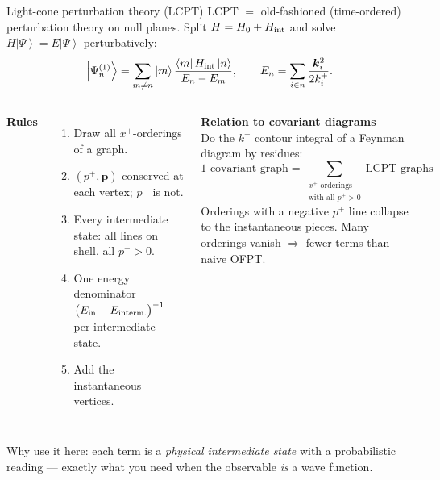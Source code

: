 \documentclass[9pt,aspectratio=169]{beamer}
\newcommand{\hl}[1]{\textcolor{acc}{#1}}
\newcommand{\hb}[1]{\textcolor{blu}{#1}}
\newcommand{\pp}{p^{+}}
\newcommand{\xp}{x^{+}}
\newcommand{\ket}[1]{\left|#1\right\rangle}
\newcommand{\bra}[1]{\left\langle#1\right|}
\begin{document}
\begin{frame}{Light-cone perturbation theory (LCPT)}
LCPT $=$ \hl{old-fashioned (time-ordered) perturbation theory} on null planes.
Split $H=H_{0}+H_{\rm int}$ and solve $H\ket{\Psi}=E\ket{\Psi}$ perturbatively:
\[
\ket{\Psi^{(1)}_{n}}=\sum_{m\neq n}\ket{m}\frac{\bra{m}H_{\rm int}\ket{n}}{E_{n}-E_{m}},
\qquad E_{n}=\sum_{i\in n}\frac{\bm k_{i}^{2}}{2k^{+}_{i}} .
\]
\begin{columns}[T,onlytextwidth]
\textbf{Rules}
\begin{enumerate}\small
  \item Draw all \hl{$\xp$-orderings} of a graph.
  \item $(\pp,\bm p)$ conserved at each vertex; \hb{$p^{-}$ is not}.
  \item Every intermediate state: all lines \hl{on shell}, all $\pp>0$.
  \item One \hl{energy denominator} $\big(E_{\rm in}-E_{\rm interm.}\big)^{-1}$ per intermediate state.
  \item Add the \hl{instantaneous} vertices.
\end{enumerate}
\vspace{-4pt}
\textbf{Relation to covariant diagrams}\\[2pt]
{\small Do the $k^{-}$ contour integral of a Feynman diagram by residues:
\[
\text{1 covariant graph}=\!\!\sum_{\substack{\xp\text{-orderings}\\ \text{with all }\pp>0}}\!\!\text{LCPT graphs}
\]
Orderings with a negative $\pp$ line collapse to the \hl{instantaneous} pieces.
Many orderings vanish $\Rightarrow$ fewer terms than naive OFPT.}
\end{columns}
\vspace{-6pt}
{\small\hl{Why use it here:} each term is a \emph{physical intermediate state} with a
probabilistic reading --- exactly what you need when the observable \emph{is} a wave function.}
\end{frame}
\end{document}
